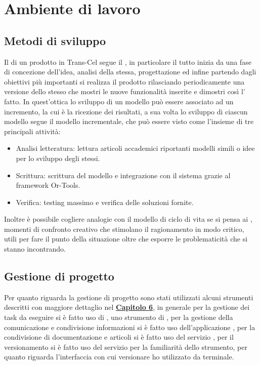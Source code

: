 \section{Ambiente di lavoro}
\subsection{Metodi di sviluppo}
Il  di un prodotto in Trans-Cel segue il , in particolare il tutto inizia da una fase di concezione dell'idea, analisi della stessa, progettazione ed infine partendo dagli obiettivi più importanti si realizza il prodotto rilasciando periodicamente una versione dello stesso che mostri le nuove funzionalità inserite e dimostri così l' fatto. In quest'ottica lo sviluppo di un modello può essere associato ad un incremento, la cui  è la ricezione dei risultati, a sua volta lo sviluppo di ciascun modello segue il modello incrementale, che può essere visto come l'insieme di tre principali attività:
\begin{itemize}
	\item Analisi letteratura: lettura articoli accademici riportanti modelli simili o idee per lo sviluppo degli stessi.
	\item Scrittura: scrittura del modello e integrazione con il sistema grazie al framework Or-Tools.
	\item Verifica: testing massimo e verifica delle soluzioni fornite.
\end{itemize}
Inoltre è possibile cogliere analogie con il modello di ciclo di vita  se si pensa ai , momenti di confronto creativo che stimolano il ragionamento in modo critico, utili per fare il punto della situazione oltre che esporre le problematicità che si stanno incontrando.

\subsection{Gestione di progetto}
Per quanto riguarda la gestione di progetto sono stati utilizzati alcuni strumenti descritti con maggiore dettaglio nel \hyperlink{(chap:capitolo6)}{\textbf{Capitolo 6}}, in generale per la gestione dei task da eseguire si è fatto uso di , uno strumento di , per la gestione della comunicazione e condivisione informazioni si è fatto uso dell'applicazione , per la condivisione di documentazione e articoli si è fatto uso del servizio , per il versionamento si è fatto uso del servizio  per la familiarità dello strumento, per quanto riguarda l'interfaccia con cui versionare ho utilizzato  da terminale.
	

